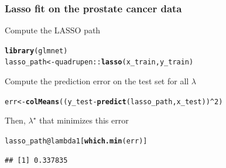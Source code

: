 \documentclass{beamer}\usepackage[]{graphicx}\usepackage[]{color}
\makeatletter
\newcommand{\hlnum}[1]{\textcolor[rgb]{0.686,0.059,0.569}{#1}}%
\newcommand{\hlopt}[1]{\textcolor[rgb]{0,0,0}{#1}}%
\newcommand{\hlstd}[1]{\textcolor[rgb]{0.345,0.345,0.345}{#1}}%
\newcommand{\hlkwb}[1]{\textcolor[rgb]{0.69,0.353,0.396}{#1}}%
\newcommand{\hlkwc}[1]{\textcolor[rgb]{0.333,0.667,0.333}{#1}}%
\newcommand{\hlkwd}[1]{\textcolor[rgb]{0.737,0.353,0.396}{\textbf{#1}}}%
\newenvironment{kframe}{%
 \def\at@end@of@kframe{}%
 \ifinner\ifhmode%
  \def\at@end@of@kframe{\end{minipage}}%
  \begin{minipage}{\columnwidth}%
 \fi\fi%
 \def\FrameCommand##1{\hskip\@totalleftmargin \hskip-\fboxsep
 \colorbox{shadecolor}{##1}\hskip-\fboxsep
     \hskip-\linewidth \hskip-\@totalleftmargin \hskip\columnwidth}%
 \MakeFramed {\advance\hsize-\width
   \@totalleftmargin\z@ \linewidth\hsize
   \@setminipage}}%
 {\par\unskip\endMakeFramed%
 \at@end@of@kframe}
\newenvironment{knitrout}{}{} %
\makeatother
\begin{document}
\begin{frame}
  \frametitle{Lasso fit on the prostate cancer data}

  \vfill
Compute the LASSO path
\begin{knitrout}\scriptsize
{}\color{fgcolor}\begin{kframe}
\begin{alltt}
\hlkwd{library}\hlstd{(glmnet)}
\hlstd{lasso_path} \hlkwb{<-} \hlstd{quadrupen}\hlopt{::}\hlkwd{lasso}\hlstd{(x_train,y_train)}
\end{alltt}
\end{kframe}
\end{knitrout}

\vfill

Compute the prediction error on the test set for all $\lambda$

\begin{knitrout}\scriptsize
{}\color{fgcolor}\begin{kframe}
\begin{alltt}
\hlstd{err} \hlkwb{<-} \hlkwd{colMeans}\hlstd{((y_test} \hlopt{-} \hlkwd{predict}\hlstd{(lasso_path, x_test))}\hlopt{^}\hlnum{2}\hlstd{)}
\end{alltt}
\end{kframe}
\end{knitrout}

\vfill

Then, $\lambda^\star$ that minimizes this error
\begin{knitrout}\scriptsize
{}\color{fgcolor}\begin{kframe}
\begin{alltt}
\hlstd{lasso_path}\hlopt{@}\hlkwc{lambda1}\hlstd{[}\hlkwd{which.min}\hlstd{(err)]}
\end{alltt}
\begin{verbatim}
## [1] 0.337835
\end{verbatim}
\end{kframe}
\end{knitrout}

\framebreak


\end{frame}
\end{document}
